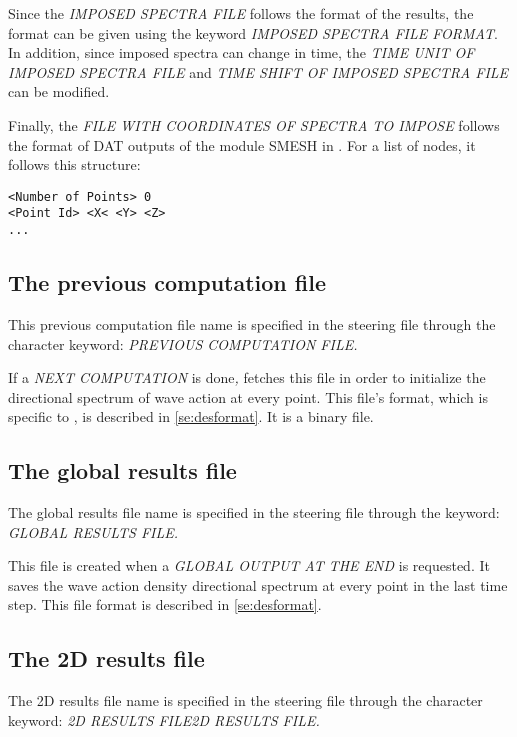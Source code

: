 Since the \textit{IMPOSED SPECTRA FILE} follows the format of the \telemacsystem{} results, the format can be given using
the keyword \textit{IMPOSED SPECTRA FILE FORMAT}. In addition, since imposed spectra can change in time, the
\textit{TIME UNIT OF IMPOSED SPECTRA FILE} and \textit{TIME SHIFT OF IMPOSED SPECTRA FILE} can be modified.

Finally, the \textit{FILE WITH COORDINATES OF SPECTRA TO IMPOSE} follows the format of DAT outputs of the
module {\scshape SMESH} in \salome{}. For a list of nodes, it follows this structure:

\lstset{language=TelemacCas,
        basicstyle=\scriptsize\ttfamily}
\begin{lstlisting}[frame=trBL]
<Number of Points> 0
<Point Id> <X< <Y> <Z>
...
\end{lstlisting}

\subsection{ The previous computation file}

 This previous computation file name is specified in the steering file through the character keyword: \textit{PREVIOUS COMPUTATION FILE.}

 If a \textit{NEXT COMPUTATION} is done\textit{, }\tomawac fetches this file in order to initialize the directional spectrum of wave action at every point. This file's format, which is specific to \tomawac, is described in \ref{se:desformat}. It is a binary file.

\subsection{ The global results file}

 The global results file name is specified in the steering file through the keyword: \textit{GLOBAL RESULTS FILE.}

 This file is created when a \textit{GLOBAL OUTPUT AT THE END} is requested. It saves the wave action density directional spectrum at every point in the last time step. This file format is described in \ref{se:desformat}.


\subsection{ The 2D results file }

 The 2D results file name is specified in the steering file through the character keyword: \textit{2D RESULTS FILE2D RESULTS FILE.}

